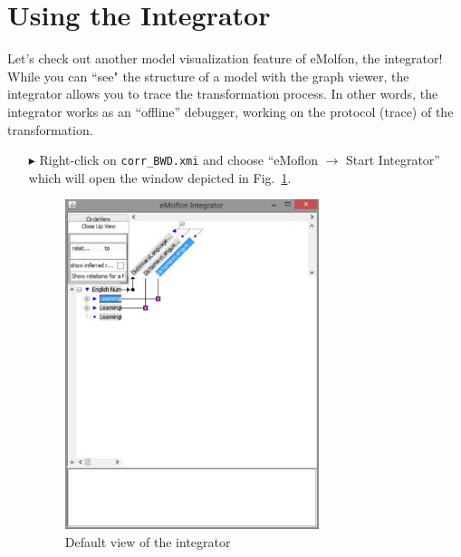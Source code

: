 \newpage
\section{Using the Integrator}
\genHeader
\label{sec:app_integrator}

Let's check out another model visualization feature of eMolfon, the integrator! While you can ``see" the structure of a model with the graph viewer, the
integrator allows you to trace the transformation process. In other words, the integrator works as an ``offline'' debugger, working on the protocol (trace) of
the transformation.

\begin{itemize}

\item[$\blacktriangleright$] Right-click on \texttt{corr\_BWD.xmi} and choose ``eMoflon $\rightarrow$ Start Integrator'' which will open the window depicted in
Fig.~\ref{fig:integrator_start}.

\vspace{0.5cm}

\begin{figure}[htbp]
\begin{center}
  \includegraphics[width=0.7\textwidth]{integrator_start_view.pdf}
  \caption{Default view of the integrator}
  \label{fig:integrator_start}
\end{center}
\end{figure}


\end{itemize}
